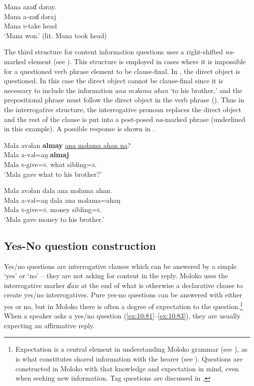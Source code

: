 \ea \label{ex:10:78}
Mana  azaɗ  dəray.\\
\gll  Mana  a-zaɗ  dəraj\\
      Mana  \textsc{s}-take  head\\
\glt  ‘Mana won.’ (lit. Mana took head)
\z

The third structure for content information questions uses a right-shifted \textit{na}{}-marked element (see ). This structure is employed in cases where it is impossible for a questioned verb phrase element to be clause-final. In , the direct object is questioned. In this case the direct object cannot be clause-final since it is necessary to include the information \textit{ana məlama ahan}\textit{ }‘to his brother,’ and the prepositional phrase must follow the direct object in the verb phrase ().  Thus in the interrogative structure, the interrogative pronoun replaces the direct object and the rest of the clause is put into a post-posed \textit{na}{}-marked phrase (underlined in this example). A possible response is shown in .

\ea \label{ex:10:79}
Mala  avəlan  \textbf{almay} \underline{ana  məlama  ahan  na}?\\
\gll  Mala  a-vəl=aŋ    \textbf{almaj}    \\
      Mala  \textsc{s}-give=\textsc{s}.{\IO}    what  {\DAT} sibling=\textsc{s}.{\POSS}  {\PSP}\\
\glt  ‘Mala gave what to his brother?’
\z

\ea \label{ex:10:80}
Mala  avəlan  dala  ana  məlama  ahan.\\
\gll  Mala  a-vəl=aŋ    dala ana  məlama=ahaŋ\\
      Mala  \textsc{s}-give=\textsc{s}.{\IO}    money  {\DAT} sibling=\textsc{s}.{\POSS}\\
\glt  ‘Mala gave money to his brother.’
\z

\subsection{Yes-No question construction}\label{sec:10.3.2}
\hypertarget{RefHeading1213021525720847}{}
Yes/no questions are interrogative clauses which can be answered by a simple ‘yes’ or ‘no’ – they are not asking for content in the reply. Moloko uses the interrogative marker \textit{ɗaw} at the end of what is otherwise a declarative clause to create yes/no interrogatives. Pure yes-no questions can be answered with either yes or no, but in Moloko there is often a degree of expectation to the question.\footnote{Expectation is a central element in understanding Moloko grammar (see ), as is what constitutes shared information with the hearer (see ). Questions are constructed in Moloko with that knowledge and expectation in mind, even when seeking new information. Tag questions are discussed in .} When a speaker asks a yes/no question (\ref{ex:10:81}–\ref{ex:10:83}), they are usually expecting an affirmative reply. 

